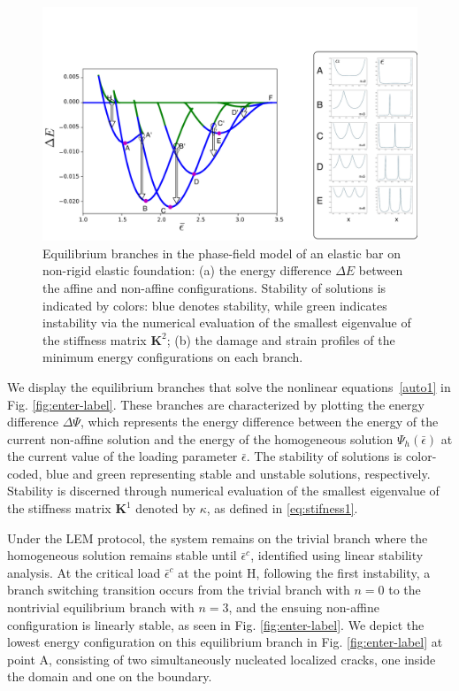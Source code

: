 \begin{figure}
\includegraphics[scale=0.1]{./final_images/fig3.pdf}
    \caption{
Equilibrium branches in the phase-field model of an elastic bar on non-rigid elastic foundation: (a) the energy difference $\Delta E$ between the affine and non-affine configurations. Stability of solutions is indicated by colors: blue denotes stability, while green indicates instability   via the numerical evaluation of the smallest eigenvalue of the stiffness matrix $\mathbf{K}^2$; (b) the damage and strain profiles of the minimum energy configurations on each branch.}
    \label{fig:enter-label2}
\end{figure}

We display the equilibrium branches that solve the nonlinear equations~\ref{auto1} in Fig. \ref{fig:enter-label}. These branches are characterized by plotting the energy difference $\Delta \Psi$, which represents the energy difference between the energy of the current non-affine solution and the energy of the homogeneous solution $\Psi_h(\bar{\epsilon})$ at the current value of the loading parameter $\bar\epsilon$. The stability of solutions is color-coded, blue and green representing stable and unstable solutions, respectively. Stability is discerned through numerical evaluation of the smallest eigenvalue  of the stiffness matrix $\mathbf{K}^1$ denoted by $\kappa$, as defined in \eqref{eq:stifness1}.

Under the LEM protocol, the system remains on the trivial branch where the homogeneous solution remains stable until $\bar\epsilon^c$, identified using linear stability analysis. At the critical load $\bar\epsilon^c$  at the point H, following the first instability, a branch switching transition occurs from the trivial branch with $n = 0$ to the nontrivial equilibrium branch with $n = 3$, and the ensuing non-affine configuration is linearly stable, as seen in Fig. \ref{fig:enter-label}. We depict the lowest energy configuration on this equilibrium branch in Fig. \ref{fig:enter-label} at point A, consisting of two simultaneously nucleated localized cracks, one inside the domain and one on the boundary. 

